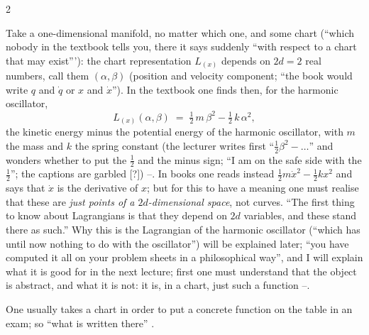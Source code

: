 \begin{paracol}{2}
\begin{example}\label{ex:lag-ho}
Take a one-dimensional manifold, no matter which one, and some chart (``which nobody in the textbook tells you, there it says suddenly ``with respect to a chart that may exist'''): the chart representation $L_{(x)}$ depends on $2d=2$ real numbers, call them $(\alpha,\beta)$ (position and velocity component; ``the book would write $q$ and $\dot q$ or $x$ and $\dot x$''). In the textbook one finds then, for the harmonic oscillator,
\begin{equation}\label{eq:lag-ho}
  L_{(x)}(\alpha,\beta)\;=\;\tfrac12\,m\,\beta^2-\tfrac12\,k\,\alpha^2 ,
\end{equation}
the kinetic energy minus the potential energy of the harmonic oscillator, with $m$ the mass and $k$ the spring constant (the lecturer writes first ``$\tfrac12\beta^2-\dots$'' and wonders whether to put the $\tfrac12$ and the minus sign; ``I am on the safe side with the $\tfrac12$''; the captions are garbled [?]) --. In books one reads instead $\tfrac12 m\dot x^2-\tfrac12kx^2$ and says that $\dot x$ is the derivative of $x$; but for this to have a meaning one must realise that these are \emph{just points of a $2d$-dimensional space}, not curves. ``The first thing to know about Lagrangians is that they depend on $2d$ variables, and these stand there as such.''
Why this is the Lagrangian of the harmonic oscillator (``which has until now nothing to do with the oscillator'') will be explained later; ``you have computed it all on your problem sheets in a philosophical way'', and I will explain what it is good for in the next lecture; first one must understand that the object is abstract, and what it is not: it is, in a chart, just such a function --.
\end{example}
One usually takes a chart in order to put a concrete function on the table in an exam; so ``what is written there'' .


\end{paracol}
